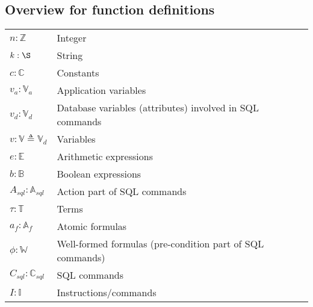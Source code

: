 \subsection{Overview for function definitions} \label{subsec:function-definitions}

\begin{center}
    \begin{tabular}{l l}
        $n: \mathbb{Z}$                          & Integer                                                   \\
        $k: \S$                                  & String                                                    \\
        $c: \mathbb{C}$                          & Constants                                                 \\
        $v_a: \mathbb{V}_a$                      & Application variables                                     \\
        $v_d: \mathbb{V}_d$                      & Database variables (attributes) involved in SQL commands  \\
        $v: \mathbb{V} \triangleq \mathbb{V}_d $ & Variables                                                 \\
        $e: \mathbb{E}$                          & Arithmetic expressions                                    \\
        $b: \mathbb{B}$                          & Boolean expressions                                       \\
        $A_{sql}: \mathbb{A}_{sql}$              & Action part of SQL commands                               \\
        $\tau: \mathbb{T}$                       & Terms                                                     \\
        $a_f: \mathbb{A}_f$                      & Atomic formulas                                           \\
        $\phi : \mathbb{W}$                      & Well-formed formulas (pre-condition part of SQL commands) \\
        $C_{sql}: \mathbb{C}_{sql}$              & SQL commands                                              \\
        $I: \mathbb{I}$                          & Instructions/commands                                     \\
    \end{tabular}
\end{center}

